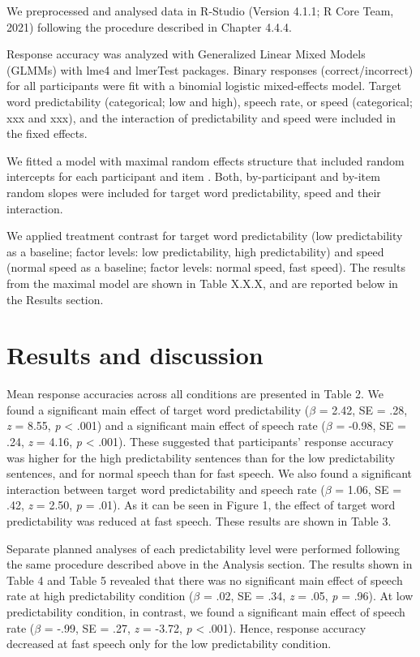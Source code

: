 \documentclass[a4paper, nobind]{templates/ociamthesis}
\begin{document}
We preprocessed and analysed data in R-Studio (Version 4.1.1; R Core Team, 2021) following the procedure described in Chapter 4.4.4.

Response accuracy was analyzed with Generalized Linear Mixed Models (GLMMs) with lme4 \autocite{Bates2015} and lmerTest \autocite{Kuznetsova2017} packages.
Binary responses (correct/incorrect) for all participants were fit with a binomial logistic mixed-effects model\autocite{Jaeger2006,Jaeger2008}.
Target word predictability (categorical; low and high), speech rate, or speed (categorical; xxx and xxx), and the interaction of predictability and speed were included in the fixed effects.

We fitted a model with maximal random effects structure that included random intercepts for each participant and item \autocite{Barr2013}.
Both, by-participant and by-item random slopes were included for target word predictability, speed and their interaction.

We applied treatment contrast for target word predictability (low predictability as a baseline; factor levels: low predictability, high predictability) and speed (normal speed as a baseline; factor levels: normal speed, fast speed).
The results from the maximal model are shown in Table X.X.X, and are reported below in the Results section.

\hypertarget{results-and-discussion-3}{%
\section{Results and discussion}\label{results-and-discussion-3}}

Mean response accuracies across all conditions are presented in Table 2.
We found a significant main effect of target word predictability (\(\beta\) = 2.42, SE = .28, \emph{z} = 8.55, \emph{p} \textless{} .001) and a significant main effect of speech rate (\(\beta\) = -0.98, SE = .24, \emph{z} = 4.16, \emph{p} \textless{} .001).
These suggested that participants' response accuracy was higher for the high predictability sentences than for the low predictability sentences, and for normal speech than for fast speech.
We also found a significant interaction between target word predictability and speech rate (\(\beta\) = 1.06, SE = .42, \emph{z} = 2.50, \emph{p} = .01). As it can be seen in Figure 1, the effect of target word predictability was reduced at fast speech. These results are shown in Table 3.

Separate planned analyses of each predictability level were performed following the same procedure described above in the Analysis section.
The results shown in Table 4 and Table 5 revealed that there was no significant main effect of speech rate at high predictability condition (\(\beta\) = .02, SE = .34, \emph{z} = .05, \emph{p} = .96).
At low predictability condition, in contrast, we found a significant main effect of speech rate (\(\beta\) = -.99, SE = .27, \emph{z} = -3.72, \emph{p} \textless{} .001).
Hence, response accuracy decreased at fast speech only for the low predictability condition.
\end{document}
